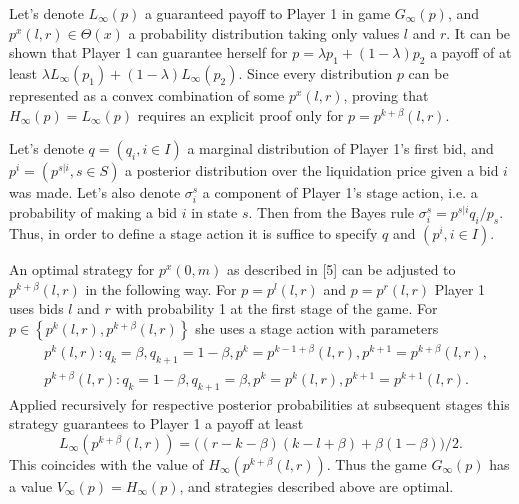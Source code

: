 Let's denote $L_\infty(p)$ a guaranteed payoff to Player 1 in game
$G_\infty(p)$, and $p^x(l, r) \in \Theta(x)$ a probability distribution taking
only values $l$ and $r$. It can be shown that Player 1 can guarantee herself for
$p = \lambda p_1 + (1-\lambda) p_2$ a payoff of at least $\lambda L_\infty(p_1)
+ (1-\lambda) L_\infty(p_2)$. Since every distribution $p$ can be represented as
a convex combination of some $p^x(l,r)$, proving that $H_\infty(p) =
L_\infty(p)$ requires an explicit proof only for $p = p^{k+\beta}(l, r)$.

Let's denote $q = (q_i, i \in I)$ a marginal distribution of Player 1's first
bid, and $p^i = (p^{s|i}, s \in S)$ a posterior distribution over the
liquidation price given a bid $i$ was made. Let's also denote $\sigma^s_i$ a
component of Player 1's stage action, i.e. a probability of making a bid $i$ in
state $s$. Then from the Bayes rule $\sigma^s_i = p^{s|i} q_i / p_s$. Thus, in
order to define a stage action it is suffice to specify $q$ and $(p^i, i \in
I)$.

An optimal strategy for $p^x(0, m)$ as described in [5] can be adjusted to
$p^{k+\beta}(l, r)$ in the following way. For $p = p^l(l, r)$ and $p = p^r(l,r)$
Player 1 uses bids $l$ and $r$ with probability 1 at the first stage of the
game. For $p \in \left\{ p^k(l, r), p^{k+\beta}(l,r) \right\}$ she uses a stage
action with parameters
\begin{align*}
  &p^k(l,r):
    q_k = \beta,
    q_{k+1} = 1-\beta,
    p^k = p^{k-1+\beta}(l,r),
    p^{k+1} = p^{k+\beta}(l,r),\\
  &p^{k+\beta}(l,r):
    q_k = 1-\beta,
    q_{k+1} = \beta,
    p^k = p^k(l,r),
    p^{k+1} = p^{k+1}(l,r).
\end{align*}
Applied recursively for respective posterior probabilities at subsequent stages
this strategy guarantees to Player 1 a payoff at least
\begin{equation*}
  L_\infty\left(p^{k+\beta}(l, r)\right)
  = \bigl( (r - k - \beta)(k - l + \beta) + \beta(1-\beta) \bigr)/2.
\end{equation*}
This coincides with the value of $H_\infty\left(p^{k+\beta}(l, r)\right)$. Thus
the game $G_\infty(p)$ has a value $V_\infty(p) = H_\infty(p)$, and strategies
described above are optimal.


